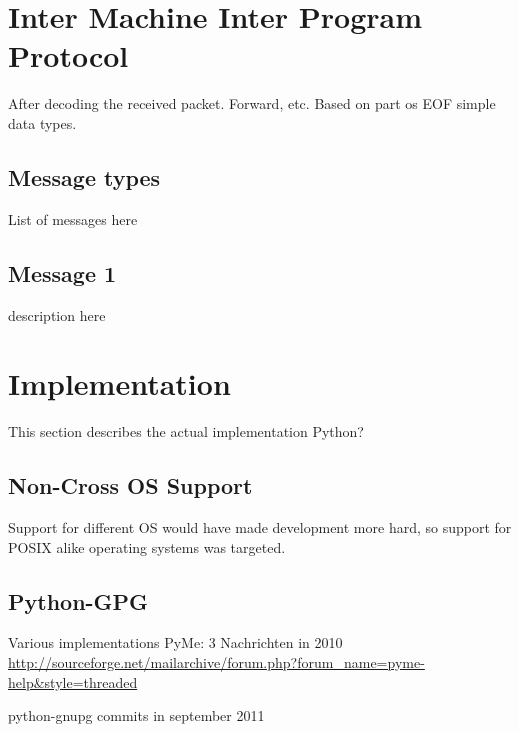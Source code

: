 \documentclass[12pt,a4paper]{article}
\begin{document}
\section{Inter Machine Inter Program Protocol}
After decoding the received packet. Forward, etc.
Based on part os EOF simple data types.
\subsection{Message types}
List of messages here
\subsection{Message 1}
description here

\section{Implementation}
This section describes the actual implementation
Python?
\subsection{Non-Cross OS Support}
Support for different OS would have made development more
hard, so support for POSIX alike operating systems was targeted.

\subsection{Python-GPG}
Various implementations \cite{python-gpg}
PyMe: 3 Nachrichten in 2010
\url{http://sourceforge.net/mailarchive/forum.php?forum_name=pyme-help&style=threaded}

python-gnupg commits in september 2011 \cite{python-gnupg}




\end{document}
